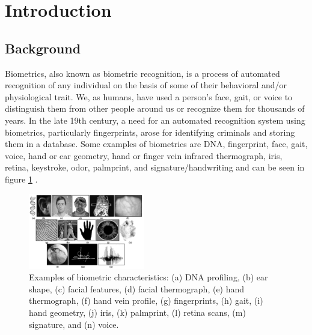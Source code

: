 
% 
\section{Introduction}
\label{introduction}



% 
\subsection{Background}
Biometrics, also known as biometric recognition, is a process of automated recognition of any individual on the basis of some of their behavioral and/or physiological trait. \cite{Jain2004}
We, as humans, have used a person's face, gait, or voice to distinguish them from other people around us or recognize them for thousands of years. In the late 19th century, a need for an automated recognition system using biometrics, particularly fingerprints, arose for identifying criminals and storing them in a database.
Some examples of biometrics are DNA, fingerprint, face, gait, voice, hand or ear geometry, hand or finger vein infrared thermograph, iris, retina, keystroke, odor, palmprint, and signature/handwriting and can be seen in figure \ref{fig:bio_ex} \cite{Jain2004}.
\begin{figure}[!ht]
    \centering 
    \includegraphics[width=0.45\textwidth]{images/Examples of biometric characteristics.png}
    \caption{Examples of biometric characteristics: (a) DNA profiling, (b) ear shape, (c) facial features, (d) facial thermograph, (e) hand thermograph, (f) hand vein profile, (g) fingerprints, (h) gait, (i) hand geometry, (j) iris, (k) palmprint, (l) retina scans, (m) signature, and (n) voice.}
    \label{fig:bio_ex}
\end{figure}


